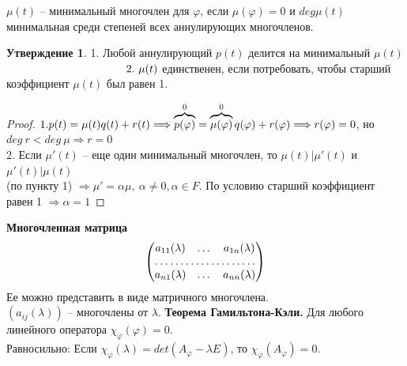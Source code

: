\documentclass[a4paper, 12pt]{article}
\newcommand\tab[1][.5cm]{\hspace*{#1}}
\theoremstyle{definition}
\newtheorem*{subtheorem}{Утверждение}
\begin{document}
    $\mu(t)$ -- минимальный многочлен для $\varphi$, если
    $\mu(\varphi) = 0$ и $deg \mu(t)$ минимальная среди
    степеней всех аннулирующих многочленов.   

    \begin{subtheorem}
        1. Любой аннулирующий $p(t)$ делится на 
        минимальный $\mu(t)$ 
        $\tab[3.8cm]2.\ \mu(t)$ единственен, если потребовать, чтобы старший\\ \tab[4.35cm]коэффициент $\mu(t)$ был равен 1. 
    \end{subtheorem}
    \begin{proof}
        $\\1. p(t) = \mu(t)q(t) + r(t) \Longrightarrow 
        \overbrace{p(\varphi)}^{0} = \overbrace{\mu(\varphi)}^{0}
        q(\varphi) + r(\varphi)
        \Longrightarrow r(\varphi) = 0$, но\\ $deg\ r < deg\ \mu
        \Longrightarrow r = 0$\\
        2. Если $\mu'(t)$ -- еще один минимальный многочлен,
        то $\mu(t)|\mu'(t)$ и $\mu'(t)|\mu(t)$\\ (по пункту 1)
        $\Longrightarrow \mu' = \alpha \mu,\ \alpha \neq 0,
        \alpha \in F$. По условию старший коэффициент равен 1
        $\Longrightarrow  \alpha = 1$     

    \end{proof}
    \textbf{Многочленная матрица}
    $$\begin{pmatrix}
        a_{11}(\lambda) & \dots & a_{1n}(\lambda)\\
        \hdotsfor{3}\\
        a_{n1}(\lambda) & \dots & a_{nn}(\lambda)
    \end{pmatrix}$$ Ее можно представить в виде матричного
    многочлена.\\ $(a_{ij}(\lambda))$ -- многочлены от $\lambda$.
    \newpage
    \textbf{Теорема Гамильтона-Кэли.} 
         Для любого линейного оператора
        $\chi_\varphi(\varphi) = 0$.\\Равносильно: Если 
        $\chi_\varphi(\lambda) = det(A_\varphi - \lambda E)$,
        то $\chi_\varphi(A_\varphi) = 0.$  
    
\end{document}
